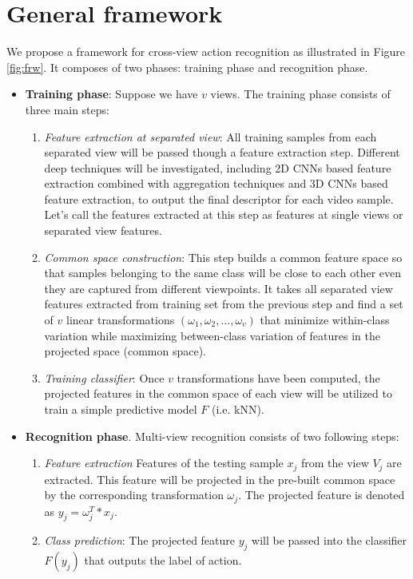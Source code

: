 
\section{General framework}
    We propose a framework for cross-view action recognition as illustrated in Figure \ref{fig:frw}. It composes of two phases: training phase and recognition phase. 
    \begin{itemize}
        \item \textbf{Training phase}: Suppose we have $v$ views. The training phase consists of three main steps: 
        \begin{enumerate}
            \item \textit{Feature extraction at separated view}: All training samples from each separated view will be passed though a feature extraction step. Different deep techniques will be investigated, including 2D CNNs based feature extraction combined with aggregation techniques and 3D CNNs based feature extraction, to output the final descriptor for each video sample. Let's call the features extracted at this step as features at single views or separated view features. 
            \item \textit{Common space construction}: This step builds a common feature space so that samples belonging to the same class will be close to each other even they are captured from different viewpoints. It takes all separated view features extracted from training set from the previous step and find a set of $v$ linear transformations $({\omega}_1, {\omega}_2, ..., {\omega}_v)$ that minimize within-class variation while maximizing between-class variation of features in the projected space (common space). 
            \item \textit{Training classifier}: Once $v$ transformations have been computed, the projected features in the common space of each view will be utilized to train a simple predictive model $F$ (i.e. kNN).
        \end{enumerate}
        \item \textbf{Recognition phase}. Multi-view recognition consists of two following steps:
        \begin{enumerate}
            \item \textit{Feature extraction} Features of the testing sample $x_j$ from the view $V_j$ are extracted. This feature will be projected in the pre-built common space by the corresponding transformation ${\omega}_j$. The projected feature is denoted as $y_j = {\omega}^T_j*x_j$.
            \item \textit{Class prediction}: The projected feature $y_j$ will be passed into the classifier $F(y_j)$ that outputs the label of action.
        \end{enumerate}
    \end{itemize}
